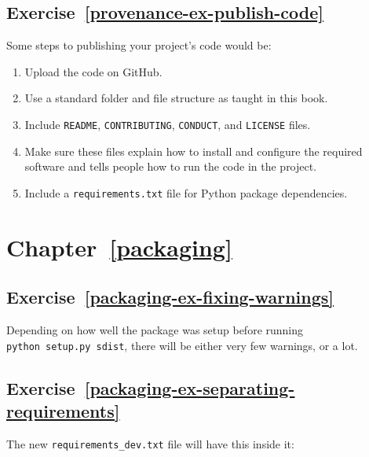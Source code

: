\documentclass[
]{krantz}
\providecommand{\tightlist}{%
  \setlength{\itemsep}{0pt}\setlength{\parskip}{0pt}}
\begin{document}
\hypertarget{exercise-refprovenance-ex-publish-code}{%
\subsection*{Exercise~\ref{provenance-ex-publish-code}}\label{exercise-refprovenance-ex-publish-code}}


Some steps to publishing your project's code would be:

\begin{enumerate}
\def\labelenumi{\arabic{enumi}.}
\tightlist
\item
  Upload the code on GitHub.
\item
  Use a standard folder and file structure as taught in this book.
\item
  Include \texttt{README}, \texttt{CONTRIBUTING}, \texttt{CONDUCT}, and \texttt{LICENSE} files.
\item
  Make sure these files explain how to install and configure the required software
  and tells people how to run the code in the project.
\item
  Include a \texttt{requirements.txt} file for Python package dependencies.
\end{enumerate}

\hypertarget{chapter-refpackaging}{%
\section*{Chapter~\ref{packaging}}\label{chapter-refpackaging}}

\hypertarget{exercise-refpackaging-ex-fixing-warnings}{%
\subsection*{Exercise~\ref{packaging-ex-fixing-warnings}}\label{exercise-refpackaging-ex-fixing-warnings}}


Depending on how well the package was setup before running \texttt{python\ setup.py\ sdist},
there will be either very few warnings, or a lot.

\hypertarget{exercise-refpackaging-ex-separating-requirements}{%
\subsection*{Exercise~\ref{packaging-ex-separating-requirements}}\label{exercise-refpackaging-ex-separating-requirements}}


The new \texttt{requirements\_dev.txt} file will have this inside it:
\end{document}
